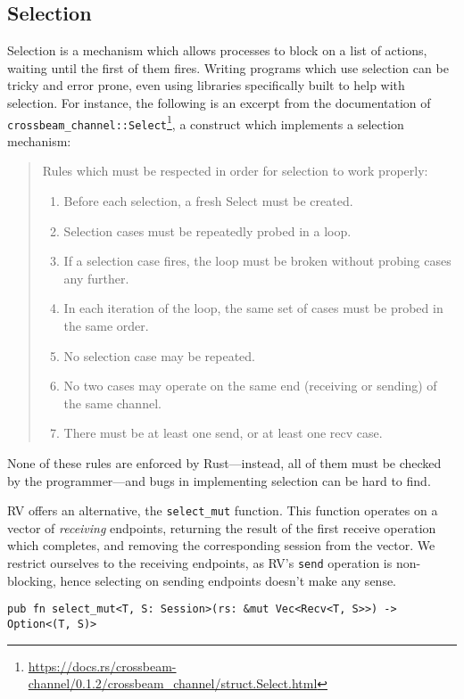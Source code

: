 \documentclass[copyright,creativecommons]{eptcs}
\begin{document}
\subsection{Selection}\label{sec:selection}
Selection is a mechanism which allows processes to block on a list of actions, waiting until the first of them fires. Writing programs which use selection can be tricky and error prone, even using libraries specifically built to help with selection. For instance, the following is an excerpt from the documentation of \lstinline{crossbeam_channel::Select}\footnote{\url{https://docs.rs/crossbeam-channel/0.1.2/crossbeam_channel/struct.Select.html}}, a construct which implements a selection mechanism:
\begin{quotation}
  \noindent
  Rules which must be respected in order for selection to work properly:
  \begin{enumerate}
  \item Before each selection, a fresh Select must be created.
  \item Selection cases must be repeatedly probed in a loop.
  \item If a selection case fires, the loop must be broken without probing cases any further.
  \item In each iteration of the loop, the same set of cases must be probed in the same order.
  \item No selection case may be repeated.
  \item No two cases may operate on the same end (receiving or sending) of the same channel.
  \item There must be at least one send, or at least one recv case.
  \end{enumerate}
\end{quotation}
None of these rules are enforced by Rust---instead, all of them must be checked by the programmer---and bugs in implementing selection can be hard to find.

RV offers an alternative, the \lstinline{select_mut} function. This function operates on a vector of \emph{receiving} endpoints, returning the result of the first receive operation which completes, and removing the corresponding session from the vector. We restrict ourselves to the receiving endpoints, as RV's \lstinline{send} operation is non-blocking, hence selecting on sending endpoints doesn't make any sense.
\begin{lstlisting}
pub fn select_mut<T, S: Session>(rs: &mut Vec<Recv<T, S>>) -> Option<(T, S)>
\end{lstlisting}
\end{document}
